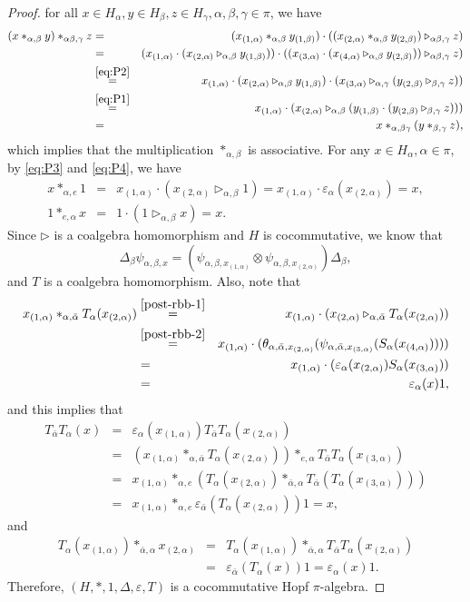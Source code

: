 \documentclass[11pt]{article}
\def\a{\alpha}
\def\b{\beta}
\def\g{\gamma}
\def\tr{\triangleright}
\def\v{\varepsilon}
\begin{document}
\begin{proof}
for all $x\in H_\a,y\in H_\b,z\in H_\g, \a,\b,\g\in\pi$, we have
\begin{eqnarray*}
(x *_{\a,\b} y)*_{\a\b,\g} z&=& (x_{(1,\a)} *_{\a,\b} y_{(1,\b)})\cdot((x_{(2,\a)} *_{\a,\b} y_{(2,\b)})\tr_{\a\b,\g} z)\\
&=&(x_{(1,\a)}\cdot (x_{(2,\a)}\tr_{\a,\b} y_{(1,\b)}))\cdot((x_{(3,\a)}\cdot (x_{(4,\a)}\tr_{\a,\b} y_{(2,\b)}))\tr_{\a\b,\g} z)\\
&\stackrel{\eqref{eq:P2}}{=}&x_{(1,\a)}\cdot (x_{(2,\a)}\tr_{\a,\b} y_{(1,\b)})\cdot (x_{(3,\a)}\tr_{\a,\g} (y_{(2,\b)}\tr_{\b,\g} z))\\
&\stackrel{\eqref{eq:P1}}{=}&x_{(1,\a)}\cdot (x_{(2,\a)}\tr_{\a,\b} (y_{(1,\b)}\cdot (y_{(2,\b)}\tr_{\b,\g} z)))\\
&=&x *_{\a,\b\g} (y*_{\b,\g} z),
\end{eqnarray*}
which implies that the multiplication $*_{\a,\b}$ is associative.  
For any $x\in H_\a, \a\in\pi$, by  \eqref{eq:P3} and \eqref{eq:P4}, we have
\begin{eqnarray*}
x *_{\a,e} 1&=&x_{(1,\a)}\cdot (x_{(2,\a)}\tr_{\a,\b} 1)=x_{(1,\a)}\cdot\v_\a(x_{(2,\a)})=x,\\
1 *_{e,\a} x&=&1\cdot (1\tr_{\a,\b} x)=x.
\end{eqnarray*}
Since $\tr$ is a coalgebra homomorphism and $H$ is cocommutative, we know that
$$\Delta_\b\psi_{\a,\b,x}=(\psi_{\a,\b,x_{(1,\a)}}\otimes\psi_{\a,\b,x_{(2,\a)}})\Delta_\b,$$
and $T$ is a coalgebra homomorphism. Also, note that
\begin{eqnarray*}
x_{(1,\a)}*_{\a,\bar{\a}} T_\a(x_{(2,\a)}) 
&\stackrel{\ref{post-rbb-1}}{=}& x_{(1,\a)}\cdot(x_{(2,\a)}\tr_{\a,\bar{\a}} T_\a(x_{(2,\a)}))\\
&\stackrel{\ref{post-rbb-2}}{=}& x_{(1,\a)}\cdot(\theta_{\a,\bar{\a},x_{(2,\a)}}(\psi_{\a,\bar{\a},x_{(3,\a)}}(S_\a(x_{(4,\a)}))))\\
&=& x_{(1,\a)}\cdot(\v_\a(x_{(2,\a)})S_\a(x_{(3,\a)}))\\
&=& \v_\a(x)1,
\end{eqnarray*}
and this implies that
\begin{eqnarray*}
T_{\bar{\a}}T_\a(x) &=& \v_\a(x_{(1,\a)})T_{\bar{\a}}T_\a(x_{(2,\a)}) \\
&=& (x_{(1,\a)}*_{\a,\bar{\a}} T_{\a}(x_{(2,\a)}))*_{e,\a} T_{\bar{\a}}T_\a(x_{(3,\a)})\\
&=& x_{(1,\a)}*_{\a,e} (T_{\a}(x_{(2,\a)})*_{\bar{\a},\a} T_{\bar{\a}}(T_\a(x_{(3,\a)})))\\
&=& x_{(1,\a)}*_{\a,e} \v_{\bar{\a}}(T_\a(x_{(2,\a)}))1 = x,
\end{eqnarray*}
and
\begin{eqnarray*}
T_\a(x_{(1,\a)}) *_{\bar{\a},\a} x_{(2,\a)} &=&  T_\a(x_{(1,\a)}) *_{\bar{\a},\a} T_{\bar{\a}}T_\a(x_{(2,\a)})\\
 &=& \v_{\bar{\a}}(T_\a(x))1 = \v_\a(x)1.
\end{eqnarray*}
Therefore, $(H,*,1,\Delta,\v,T)$ is a cocommutative Hopf $\pi$-algebra.


\end{proof}
\end{document}
